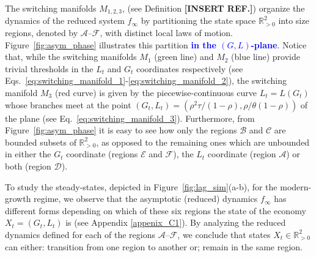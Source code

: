 \documentclass[a4paper,fleqn]{cas-sc}
\newcommand{\samb}[1]{\textcolor{blue}{\textbf{#1}}}
\begin{document}
The switching manifolds $M_{1,2,3}$, (see Definition \textbf{[INSERT REF.]}) organize the dynamics of the reduced system $f_{\infty}$ by partitioning the state space $\mathbb R^2_{>0}$ into size regions, denoted by $\mathcal A$--$\mathcal F$, with distinct local laws of motion. 
Figure~\ref{fig:asym_phase} illustrates this partition \samb{in the $(G,L)$-plane}.
Notice that, while the switching manifolds $M_1$ (green line) and $M_2$ (blue line) provide trivial thresholds in the $L_t$ and $G_t$ coordinates respectively (see Eqs.~\eqref{eq:switching_manifold_1}-\eqref{eq:switching_manifold_2}), the switching manifold $M_3$ (red curve) is given by the piecewise-continuous curve $L_t=L(G_t)$ whose branches meet at the point $(G_t,L_t)=(\rho^2\tau/(1-\rho),\rho/\theta(1-\rho))$ of the plane (see Eq.~\eqref{eq:switching_manifold_3}).
Furthermore, from Figure~\ref{fig:asym_phase} it is easy to see how only the regions $\mathcal B$ and $\mathcal{C}$ are bounded subsets of $\mathbb{R}^2_{>0}$, as opposed to the remaining ones which are unbounded in either the $G_t$ coordinate (regions $\mathcal E$ and $\mathcal F$), the $L_t$ coordinate (region $\mathcal A$) or both (region $\mathcal D$).

To study the steady-states, depicted in Figure~\ref{fig:lag_sim}(a-b), for the modern-growth regime, we observe that the asymptotic (reduced) dynamics $f_{\infty}$ has different forms depending on which of these six regions the state of the economy $X_t=(G_t,L_t)$ is (see Appendix \ref{appenix_C1}).
By analyzing the reduced dynamics defined for each of the regions $\mathcal A$--$\mathcal F$, we conclude that states $X_t\in\mathbb{R}^2_{>0}$ can either: transition from one region to another or; remain in the same region.
\end{document}
